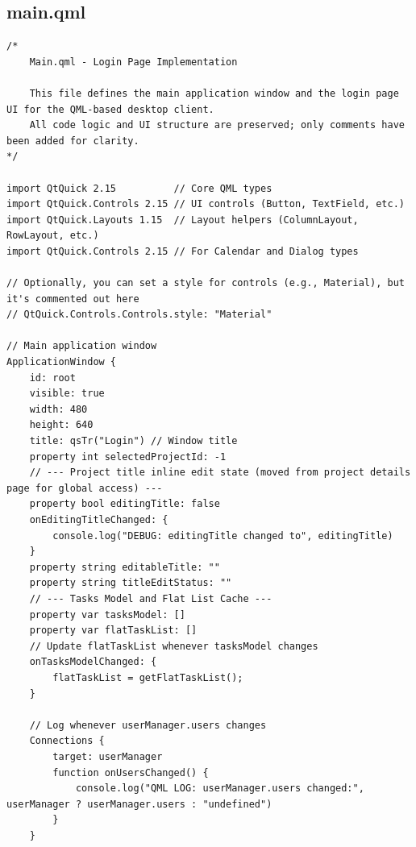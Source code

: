\documentclass{report}
\begin{document}
\subsection{main.qml}
\begin{lstlisting}[style=qmlstyle]
    /*
    Main.qml - Login Page Implementation

    This file defines the main application window and the login page UI for the QML-based desktop client.
    All code logic and UI structure are preserved; only comments have been added for clarity.
*/

import QtQuick 2.15          // Core QML types
import QtQuick.Controls 2.15 // UI controls (Button, TextField, etc.)
import QtQuick.Layouts 1.15  // Layout helpers (ColumnLayout, RowLayout, etc.)
import QtQuick.Controls 2.15 // For Calendar and Dialog types

// Optionally, you can set a style for controls (e.g., Material), but it's commented out here
// QtQuick.Controls.Controls.style: "Material"

// Main application window
ApplicationWindow {
    id: root
    visible: true
    width: 480
    height: 640
    title: qsTr("Login") // Window title
    property int selectedProjectId: -1
    // --- Project title inline edit state (moved from project details page for global access) ---
    property bool editingTitle: false
    onEditingTitleChanged: {
        console.log("DEBUG: editingTitle changed to", editingTitle)
    }
    property string editableTitle: ""
    property string titleEditStatus: ""
    // --- Tasks Model and Flat List Cache ---
    property var tasksModel: []
    property var flatTaskList: []
    // Update flatTaskList whenever tasksModel changes
    onTasksModelChanged: {
        flatTaskList = getFlatTaskList();
    }

    // Log whenever userManager.users changes
    Connections {
        target: userManager
        function onUsersChanged() {
            console.log("QML LOG: userManager.users changed:", userManager ? userManager.users : "undefined")
        }
    }


\end{lstlisting}
\end{document}
